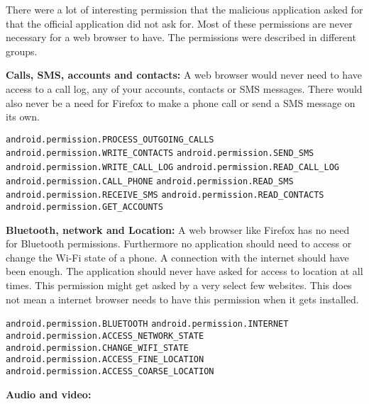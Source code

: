 \newpage
There were a lot of interesting permission that the malicious application asked for that the official application did not ask for.
Most of these permissions are never necessary for a web browser to have. The permissions were described in different groups.

\textbf{Calls, SMS, accounts and contacts:}
A web browser would never need to have access to a call log, any of your accounts, contacts or SMS messages.
There would also never be a need for Firefox to make a phone call or send a SMS message on its own.

\texttt{android.permission.PROCESS\_OUTGOING\_CALLS}
\newline \texttt{android.permission.WRITE\_CONTACTS}
\newline \texttt{android.permission.SEND\_SMS}
\newline \texttt{android.permission.WRITE\_CALL\_LOG}
\newline \texttt{android.permission.READ\_CALL\_LOG}
\newline \texttt{android.permission.CALL\_PHONE}
\newline \texttt{android.permission.READ\_SMS}
\newline \texttt{android.permission.RECEIVE\_SMS}
\newline \texttt{android.permission.READ\_CONTACTS}
\newline \texttt{android.permission.GET\_ACCOUNTS}

\textbf{Bluetooth, network and Location:}
A web browser like Firefox has no need for Bluetooth permissions.
Furthermore no application should need to access or change the Wi-Fi state of a phone.
A connection with the internet should have been enough.
The application should never have asked for access to location at all times.
This permission might get asked by a very select few websites.
This does not mean a internet browser needs to have this permission when it gets installed. 

\texttt{android.permission.BLUETOOTH}
\newline \texttt{android.permission.INTERNET}
\newline \texttt{android.permission.ACCESS\_NETWORK\_STATE}
\newline \texttt{android.permission.CHANGE\_WIFI\_STATE}
\newline \texttt{android.permission.ACCESS\_FINE\_LOCATION}
\newline \texttt{android.permission.ACCESS\_COARSE\_LOCATION}

\textbf{Audio and video:}


